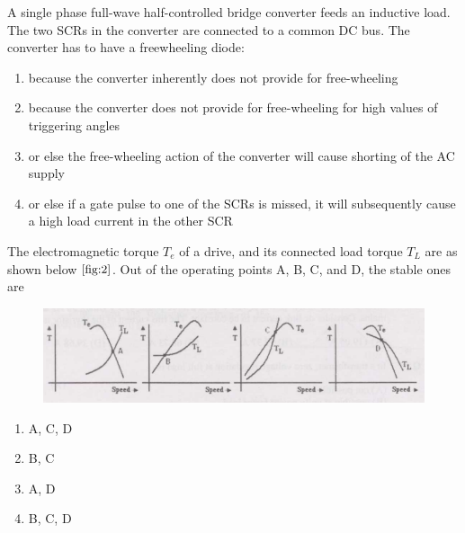     \item A single phase full-wave half-controlled bridge converter feeds an inductive load. \\The two SCRs in the converter are connected to a common DC bus. The converter has to have a freewheeling diode:
    \begin{enumerate}
        \item  because the converter inherently does not provide for free-wheeling
        \item  because the converter does not provide for free-wheeling for high values of triggering angles
        \item  or else the free-wheeling action of the converter will cause shorting of the AC supply
        \item  or else if a gate pulse to one of the SCRs is missed, it will subsequently cause a high load current in the other SCR
    \end{enumerate}
    \bigskip
    \item The electromagnetic torque $T_e$ of a drive, and its connected load torque $T_L$ are as shown below $\ref{fig:2}$. Out of the operating points A, B, C, and D, the stable ones are
    \begin{figure}[!ht]
    \centering
    \includegraphics[width=\linewidth]{GATE-yearwise/GATE(1)/figs/2.png}
    \caption{}
    \label{fig:2}
    \end{figure}
\begin{multicols}{4}
\begin{enumerate}
    \item A, C, D
    \item B, C
    \item A, D
    \item B, C, D
\end{enumerate}
\end{multicols}
